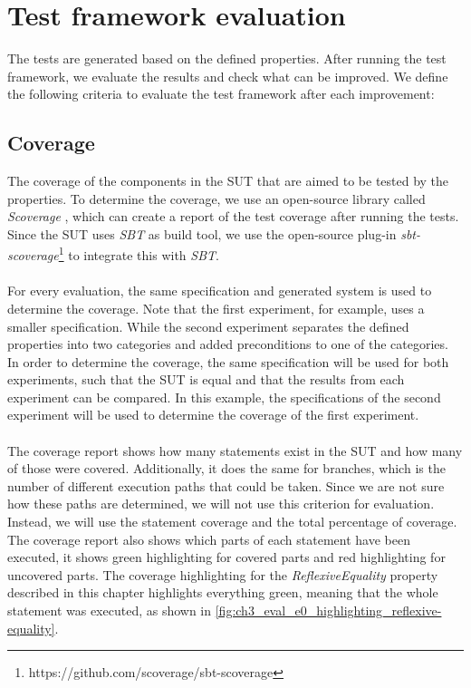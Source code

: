 \section{Test framework evaluation}
The tests are generated based on the defined properties. After running the test framework, we evaluate the results and check what can be improved. We define the following criteria to evaluate the test framework after each improvement:

\subsection*{Coverage}
The coverage of the components in the SUT that are aimed to be tested by the properties. To determine the coverage, we use an open-source library called \textit{Scoverage} \cite{siteScoverage2017}, which can create a report of the test coverage after running the tests. Since the SUT uses \textit{SBT} as build tool, we use the open-source plug-in \textit{sbt-scoverage}\footnote{https://github.com/scoverage/sbt-scoverage} to integrate this with \textit{SBT}.\\
\\
For every evaluation, the same specification and generated system is used to determine the coverage. Note that the first experiment, for example, uses a smaller specification. While the second experiment separates the defined properties into two categories and added preconditions to one of the categories. In order to determine the coverage, the same specification will be used for both experiments, such that the SUT is equal and that the results from each experiment can be compared. In this example, the specifications of the second experiment will be used to determine the coverage of the first experiment.\\
\\
The coverage report shows how many statements exist in the SUT and how many of those were covered. Additionally, it does the same for branches, which is the number of different execution paths that could be taken. Since we are not sure how these paths are determined, we will not use this criterion for evaluation. Instead, we will use the statement coverage and the total percentage of coverage. The coverage report also shows which parts of each statement have been executed, it shows green highlighting for covered parts and red highlighting for uncovered parts. The coverage highlighting for the \textit{ReflexiveEquality} property described in this chapter highlights everything green, meaning that the whole statement was executed, as shown in \autoref{fig:ch3_eval_e0_highlighting_reflexive-equality}.
